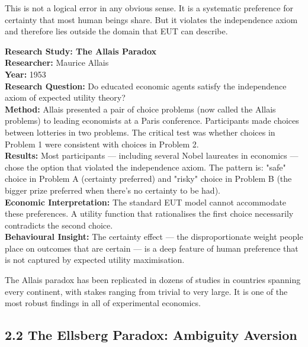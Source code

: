 \documentclass[12pt, letterpaper]{article}
\begin{document}
This is not a logical error in any obvious sense. It is a systematic preference for certainty that most human beings share. But it violates the independence axiom and therefore lies outside the domain that EUT can describe.

\begin{researchbox}
\textbf{Research Study: The Allais Paradox}\\[4pt]

\textbf{Researcher:} Maurice Allais\\[4pt]
\textbf{Year:} 1953\\[4pt]
\textbf{Research Question:} Do educated economic agents satisfy the independence axiom of expected utility theory?\\[4pt]
\textbf{Method:} Allais presented a pair of choice problems (now called the Allais problems) to leading economists at a Paris conference. Participants made choices between lotteries in two problems. The critical test was whether choices in Problem 1 were consistent with choices in Problem 2.\\[4pt]
\textbf{Results:} Most participants --- including several Nobel laureates in economics --- chose the option that violated the independence axiom. The pattern is: "safe" choice in Problem A (certainty preferred) and "risky" choice in Problem B (the bigger prize preferred when there's no certainty to be had).\\[4pt]
\textbf{Economic Interpretation:} The standard EUT model cannot accommodate these preferences. A utility function that rationalises the first choice necessarily contradicts the second choice.\\[4pt]
\textbf{Behavioural Insight:} The certainty effect --- the disproportionate weight people place on outcomes that are certain --- is a deep feature of human preference that is not captured by expected utility maximisation.\\[4pt]
\end{researchbox}

The Allais paradox has been replicated in dozens of studies in countries spanning every continent, with stakes ranging from trivial to very large. It is one of the most robust findings in all of experimental economics.

\medskip


\subsection{2.2 The Ellsberg Paradox: Ambiguity Aversion}
\end{document}
